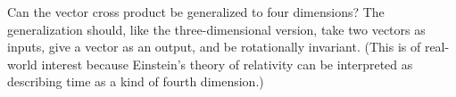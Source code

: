 Can the vector cross product be generalized to four dimensions?
The generalization should, like the three-dimensional version,
take two vectors as inputs, give a vector as an output, and be
rotationally invariant.
(This is of real-world interest because Einstein's theory of relativity
can be interpreted as describing time as a kind of fourth dimension.)
